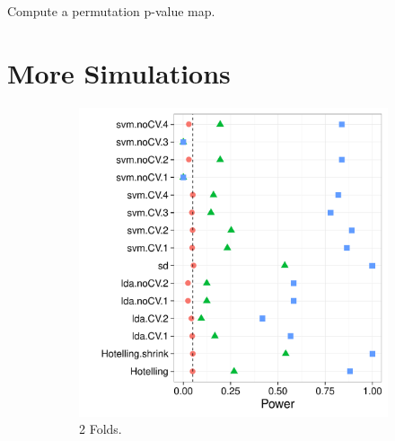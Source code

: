 \documentclass[12pt,a4paper]{article}
\begin{document}
\begin{algorithm}[H]
\caption{Compute a permutation p-value map.} 
\label{algo:permutation}

\end{algorithm}

\newpage

\section{More Simulations}


\begin{figure}[h]
\centering
\caption{\footnotesize [TODO].}	
	\begin{subfigure}{.5\textwidth}
	  \centering
	  \includegraphics[width=1\linewidth]{"art/2016-07-27 21:21:12"}
	  \caption{2 Folds.}  %
	\label{fig:2016-07-2721:21:12}
	\end{subfigure}%
	\begin{subfigure}{.5\textwidth}
	  \centering

\end{subfigure}
\end{figure}
\end{document}
